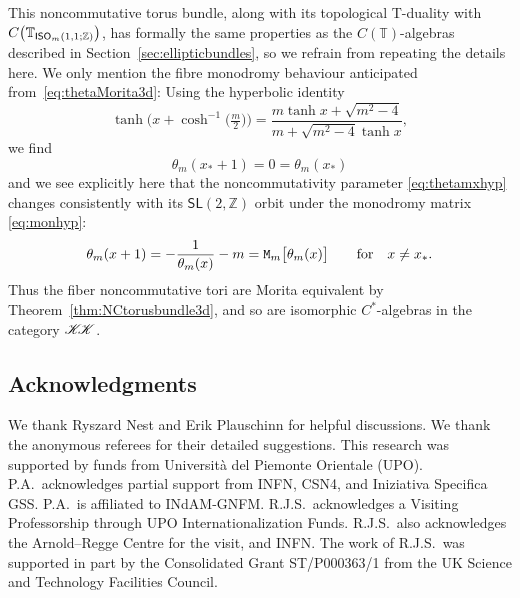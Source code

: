\documentclass[pdftex]{sigma}
\numberwithin{equation}{section}
\newcommand{\Z}{\zed}
\newcommand{\CCK}{\mathscr{K}}
\newcommand{\sfSL}{\mathsf{SL}}
\newcommand{\ISO}{{\sf ISO}}
\newcommand{\zed}{{\mathbb Z}} %
\newcommand{\torus}{{\mathbb T}} %
\begin{document}
This noncommutative torus bundle, along with its topological T-duality with
$C\big(\torus_{\ISO_m(1,1;\Z)}\big)$, has formally the same properties
as the $C(\torus)$-algebras described in
Section~\ref{sec:ellipticbundles}, so
we refrain from repeating the details here. We only mention the
fibre monodromy behaviour anticipated from~\eqref{eq:thetaMorita3d}: Using the hyperbolic identity
\[
\tanh\big(x+\cosh^{-1}\big(\tfrac m2\big)\big) = \frac{m\tanh x+\sqrt{m^2-4}}{m+\sqrt{m^2-4} \tanh x} ,
\]
we find
\[
\theta_m(x_*+1)=0=\theta_m(x_*)
\]
and
we see explicitly here that the noncommutativity parameter \eqref{eq:thetamxhyp}
changes consistently with its $\sfSL(2,\Z)$ orbit under the monodromy
matrix \eqref{eq:monhyp}:
\[
\theta_m(x+1) = -\frac1{\theta_m(x)}-m = {\tt
 M}_m\big[\theta_m(x)\big] \qquad \mbox{for} \quad x\neq x_* .
\]
Thus the fiber noncommutative tori are Morita equivalent by
Theorem~\ref{thm:NCtorusbundle3d},
and so are isomorphic $C^*$-algebras in the category
$\CCK\hspace{-1mm}\CCK$.

\subsection*{Acknowledgments}

We thank Ryszard Nest and Erik Plauschinn for helpful
discussions. We thank the anonymous referees for their detailed suggestions. This research was supported by funds from Universit\`a del
Piemonte Orientale (UPO). P.A.\ acknowledges partial support from INFN,
CSN4, and Iniziativa Specifica GSS. P.A.\ is affiliated to INdAM-GNFM. R.J.S.\ acknowledges a Visiting
Professorship through UPO Internationalization Funds. R.J.S.\ also
acknowledges the Arnold--Regge Centre for the visit, and INFN. The work of R.J.S.\ was supported in
part by the Consolidated Grant ST/P000363/1 from the UK Science and
Technology Facilities Council.
\end{document}
